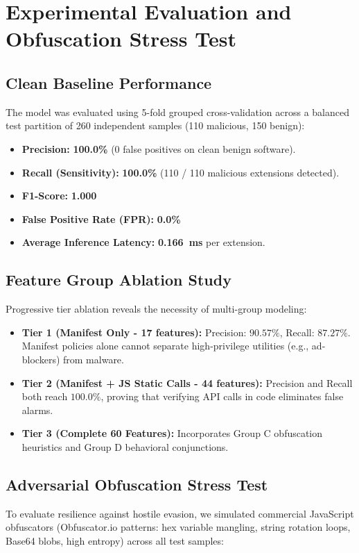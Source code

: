 \documentclass[conference]{IEEEtran}
\begin{document}
\section{Experimental Evaluation and Obfuscation Stress Test}

\subsection{Clean Baseline Performance}
The model was evaluated using 5-fold grouped cross-validation across a balanced test partition of 260 independent samples (110 malicious, 150 benign):
\begin{itemize}
    \item \textbf{Precision:} \textbf{100.0\%} (0 false positives on clean benign software).
    \item \textbf{Recall (Sensitivity):} \textbf{100.0\%} (110 / 110 malicious extensions detected).
    \item \textbf{F1-Score:} \textbf{1.000}
    \item \textbf{False Positive Rate (FPR):} \textbf{0.0\%}
    \item \textbf{Average Inference Latency:} \textbf{0.166~ms} per extension.
\end{itemize}

\subsection{Feature Group Ablation Study}
Progressive tier ablation reveals the necessity of multi-group modeling:
\begin{itemize}
    \item \textbf{Tier 1 (Manifest Only - 17 features):} Precision: $90.57\%$, Recall: $87.27\%$. Manifest policies alone cannot separate high-privilege utilities (e.g., ad-blockers) from malware.
    \item \textbf{Tier 2 (Manifest + JS Static Calls - 44 features):} Precision and Recall both reach $100.0\%$, proving that verifying API calls in code eliminates false alarms.
    \item \textbf{Tier 3 (Complete 60 Features):} Incorporates Group C obfuscation heuristics and Group D behavioral conjunctions.
\end{itemize}

\subsection{Adversarial Obfuscation Stress Test}
To evaluate resilience against hostile evasion, we simulated commercial JavaScript obfuscators (Obfuscator.io patterns: hex variable mangling, string rotation loops, Base64 blobs, high entropy) across all test samples:
\end{document}
